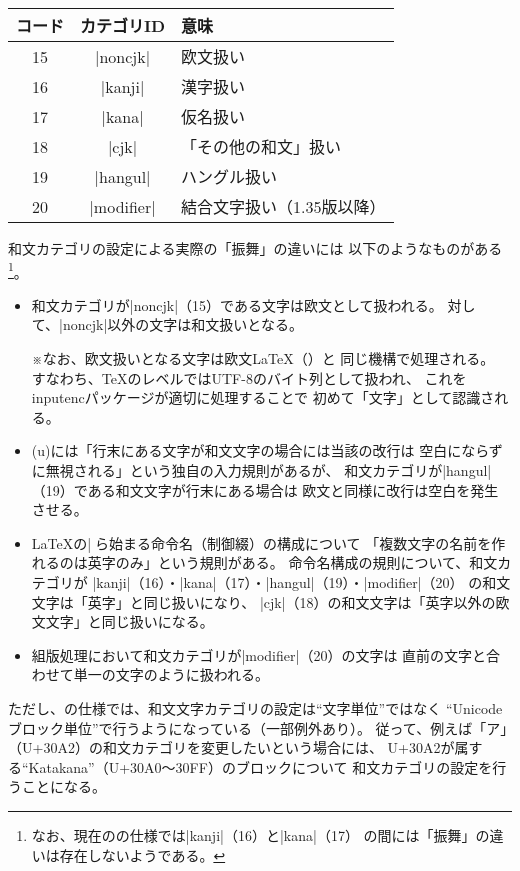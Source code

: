 \documentclass[uplatex,dvipdfmx,a4paper]{jsarticle}
\newcommand{\Pkg}[1]{\textsf{#1}}
\newcommand{\Note}{\par\noindent ※}
\begin{document}
\begin{center}\small\begin{tabular}{ccl}
  \hline
  コード & カテゴリID & 意味 \\
  \hline
  15 & |noncjk| & 欧文扱い \\
  16 & |kanji|  & 漢字扱い \\
  17 & |kana|   & 仮名扱い \\
  18 & |cjk|    & 「その他の和文」扱い \\
  19 & |hangul| & ハングル扱い \\
  20 & |modifier| & 結合文字扱い（1.35版以降） \\
  \hline
\end{tabular}\end{center}
和文カテゴリの設定による実際の「振舞」の違いには
以下のようなものがある
\footnote{なお、現在の{\upTeX}の仕様では|kanji|（16）と|kana|（17）
  の間には「振舞」の違いは存在しないようである。}。
\begin{itemize}
\item 和文カテゴリが|noncjk|（15）である文字は欧文として扱われる。
  対して、|noncjk|以外の文字は和文扱いとなる。
  \Note なお、欧文扱いとなる文字は欧文{\LaTeX}（{\pdfLaTeX}）と
  同じ機構で処理される。
  すなわち、{\TeX}のレベルではUTF-8のバイト列として扱われ、
  これを\Pkg{inputenc}パッケージが適切に処理することで
  初めて「文字」として認識される。
\item (u){\pLaTeX}には「行末にある文字が和文文字の場合には当該の改行は
  空白にならずに無視される」という独自の入力規則があるが、
  和文カテゴリが|hangul|（19）である和文文字が行末にある場合は
  欧文と同様に改行は空白を発生させる。
\item {\LaTeX}の|\|から始まる命令名（制御綴）の構成について
  「複数文字の名前を作れるのは英字のみ」という規則がある。
  命令名構成の規則について、和文カテゴリが
  |kanji|（16）・|kana|（17）・|hangul|（19）・|modifier|（20）
  の和文文字は「英字」と同じ扱いになり、
  |cjk|（18）の和文文字は「英字以外の欧文文字」と同じ扱いになる。
\item 組版処理において和文カテゴリが|modifier|（20）の文字は
  直前の文字と合わせて単一の文字のように扱われる。
\end{itemize}

ただし、{\upTeX}の仕様では、和文文字カテゴリの設定は“文字単位”ではなく
“Unicodeブロック単位”で行うようになっている（一部例外あり）。
従って、例えば「ア」（U+30A2）の和文カテゴリを変更したいという場合には、
U+30A2が属する“Katakana”（U+30A0～30FF）のブロックについて
和文カテゴリの設定を行うことになる。
\end{document}
